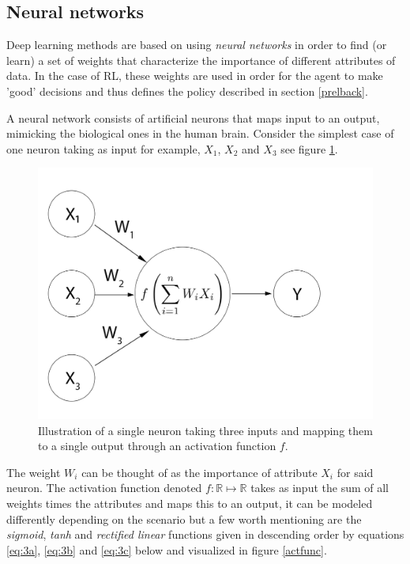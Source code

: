 \documentclass[journal,twoside]{IEEEtran}
\begin{document}
\subsection{Neural networks}

Deep learning methods are based on using \textit{neural networks} in order to find (or learn) a set of weights that characterize the importance of different attributes of data. In the case of RL, these weights are used in order for the agent to make 'good' decisions and thus defines the policy described in section \ref{prelback}.

A neural network consists of artificial neurons that maps input to an output, mimicking the biological ones in the human brain. Consider the simplest case of one neuron taking as input for example, $X_1$, $X_2$ and $X_3$  see figure \ref{singleneuron}. 

\begin{figure}[!h]
	\centering
	\includegraphics[width=0.8\columnwidth]{network}
	\caption{Illustration of a single neuron taking three inputs and mapping them to a single output through an activation function $f$.}
	\label{singleneuron}
\end{figure} 

The weight $W_i$ can be thought of as the importance of attribute $X_i$ for said neuron. The activation function denoted $f: \mathbb{R}\mapsto\mathbb{R}$ takes as input the sum of all weights times the attributes and maps this to an output, it can be modeled differently depending on the scenario but a few worth mentioning are the \textit{sigmoid}, \textit{tanh} and \textit{rectified linear} functions given in descending order by equations \eqref{eq:3a}, \eqref{eq:3b} and \eqref{eq:3c} below and visualized in figure \ref{actfunc}.
\end{document}
